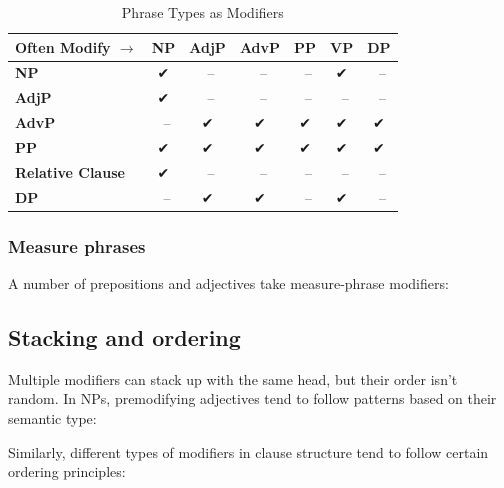 \begin{table}[h]
\centering
\begin{tabular}{lcccccc}
\hline
Often Modify $\rightarrow$ & NP & AdjP & AdvP & PP & VP & DP \\
\hline
\textbf{NP} & ✔ &~-- &~-- &~-- & ✔ &~-- \\
\textbf{AdjP} & ✔ &~-- &~-- &~-- &~-- &~-- \\
\textbf{AdvP} &~-- & ✔ & ✔ & ✔ & ✔ & ✔ \\
\textbf{PP} & ✔ & ✔ & ✔ & ✔ & ✔ & ✔ \\
\textbf{Relative Clause} & ✔ &~-- &~-- &~-- &~-- &~-- \\
\textbf{DP} &~-- & ✔ & ✔ &~-- & ✔ &~-- \\
\hline
\end{tabular}
\caption{Phrase Types as Modifiers}
\label{tab:modifiers}
\end{table}

\subsubsection{Measure phrases}

A number of prepositions and adjectives take measure-phrase modifiers:
\ea
    \z
    \z
\z

\subsection{Stacking and ordering}

Multiple modifiers can stack up with the same head, but their order isn't random. In NPs, premodifying adjectives tend to follow patterns based on their semantic type:

\ea\label{ex:adj-order}
   \z
\z

\noindent Similarly, different types of modifiers in clause structure tend to follow certain ordering principles:

